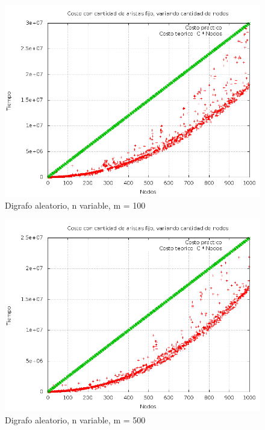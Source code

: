 \begin{figure}[H]
	\centering
	\includegraphics[scale=0.5]{dag_100_n_var.png}
	\caption{Digrafo aleatorio,  n variable, m = 100}
\end{figure}

\begin{figure}[H]
	\centering
	\includegraphics[scale=0.5]{dag_500_n_var.png}
	\caption{Digrafo aleatorio, n variable, m = 500}
\end{figure}




